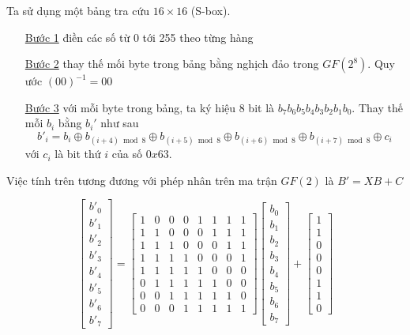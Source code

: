 Ta sử dụng một bảng tra cứu $16 \times 16$ (S-box).

\begin{itemize}
    \item [\underline{Bước 1}] điền các số từ 0 tới 255 theo từng hàng
    \item [\underline{Bước 2}] thay thế mối byte trong bảng bằng nghịch đảo trong $GF(2^8)$. Quy ước $(00)^{-1} = 00$
    \item [\underline{Bước 3}] với mỗi byte trong bảng, ta ký hiệu 8 bit là $b_7 b_6 b_5 b_4 b_3 b_2 b_1 b_0$. Thay thế mỗi $b_i$ bằng $b_i'$ như sau
    \[ b'_i = b_i \oplus b_{(i+4) \bmod 8} \oplus b_{(i+5) \bmod 8} \oplus b_{(i+6) \bmod 8} \oplus b_{(i+7) \bmod 8} \oplus c_i \]
    với $c_i$ là bit thứ $i$ của số $0x63$.
\end{itemize}

Việc tính trên tương đương với phép nhân trên ma trận $GF(2)$ là $B' = XB + C$

\[ \begin{bmatrix}
    b'_0 \\ b'_1 \\ b'_2 \\ b'_3 \\ b'_4 \\ b'_5 \\ b'_6 \\ b'_7
\end{bmatrix} = 
\begin{bmatrix}
    1 & 0 & 0 & 0 & 1 & 1 & 1 & 1 \\
    1 & 1 & 0 & 0 & 0 & 1 & 1 & 1 \\
    1 & 1 & 1 & 0 & 0 & 0 & 1 & 1 \\
    1 & 1 & 1 & 1 & 0 & 0 & 0 & 1 \\
    1 & 1 & 1 & 1 & 1 & 0 & 0 & 0 \\
    0 & 1 & 1 & 1 & 1 & 1 & 0 & 0 \\
    0 & 0 & 1 & 1 & 1 & 1 & 1 & 0 \\
    0 & 0 & 0 & 1 & 1 & 1 & 1 & 1
\end{bmatrix} 
\begin{bmatrix}
    b_0 \\ b_1 \\ b_2 \\ b_3 \\ b_4 \\ b_5 \\ b_6 \\ b_7
\end{bmatrix} + 
\begin{bmatrix}
    1 \\ 1 \\ 0 \\ 0 \\ 0 \\ 1 \\ 1 \\ 0
\end{bmatrix}\]

